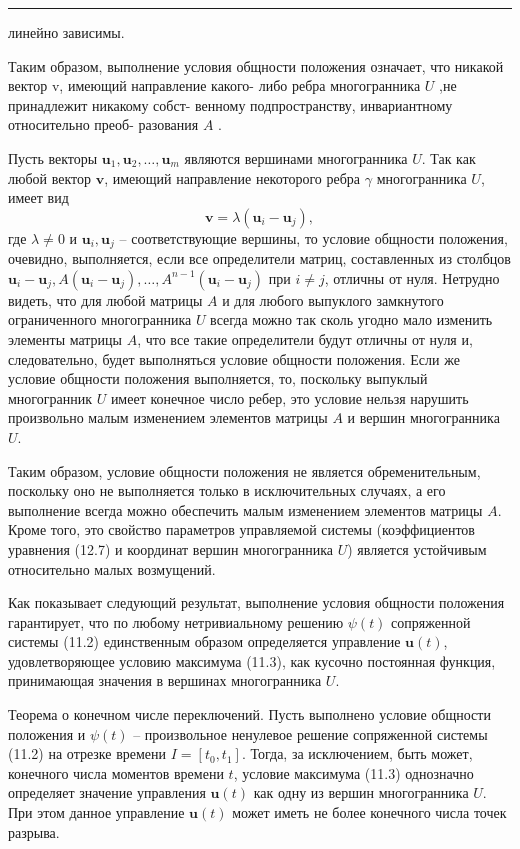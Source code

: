 \documentclass[8pt]{extarticle}
\newcommand{\HRule}{\begin{center}\rule{0.9\linewidth}{0.2mm}\end{center}}
\begin{document}
\HRule

линейно зависимы.

Таким образом, выполнение условия общности положения означает, что никакой вектор v, имеющий направление какого- либо ребра многогранника \(U\) ,не принадлежит никакому собст- венному подпространству, инвариантному относительно преоб- разования \(A\) .

Пусть векторы \({\mathbf{u}}_{1},{\mathbf{u}}_{2},\ldots ,{\mathbf{u}}_{m}\) являются вершинами многогранника \(U\). Так как любой вектор \(\mathbf{v}\), имеющий направление некоторого ребра \(\gamma\) многогранника \(U\), имеет вид
\[
\mathbf{v} = \lambda \left( {\mathbf{u}}_{i} - {\mathbf{u}}_{j}\right),
\]
где \(\lambda \neq 0\) и \({\mathbf{u}}_{i},{\mathbf{u}}_{j}\) -- соответствующие вершины, то условие общности положения, очевидно, выполняется, если все определители матриц, составленных из столбцов \({\mathbf{u}}_{i} - {\mathbf{u}}_{j}, A\left( {\mathbf{u}}_{i} - {\mathbf{u}}_{j}\right), \ldots, {A}^{n-1}\left( {\mathbf{u}}_{i} - {\mathbf{u}}_{j}\right)\) при \(i \neq j\), отличны от нуля. Нетрудно видеть, что для любой матрицы \(A\) и для любого выпуклого замкнутого ограниченного многогранника \(U\) всегда можно так сколь угодно мало изменить элементы матрицы \(A\), что все такие определители будут отличны от нуля и, следовательно, будет выполняться условие общности положения. Если же условие общности положения выполняется, то, поскольку выпуклый многогранник \(U\) имеет конечное число ребер, это условие нельзя нарушить произвольно малым изменением элементов матрицы \(A\) и вершин многогранника \(U\).

Таким образом, условие общности положения не является обременительным, поскольку оно не выполняется только в исключительных случаях, а его выполнение всегда можно обеспечить малым изменением элементов матрицы \(A\). Кроме того, это свойство параметров управляемой системы (коэффициентов уравнения (12.7) и координат вершин многогранника \(U\)) является устойчивым относительно малых возмущений.

Как показывает следующий результат, выполнение условия общности положения гарантирует, что по любому нетривиальному решению \(\psi \left( t\right)\) сопряженной системы (11.2) единственным образом определяется управление \(\mathbf{u}\left( t\right)\), удовлетворяющее условию максимума (11.3), как кусочно постоянная функция, принимающая значения в вершинах многогранника \(U\).

Теорема о конечном числе переключений. Пусть выполнено условие общности положения и \(\psi(t)\) -- произвольное ненулевое решение сопряженной системы (11.2) на отрезке времени \(I = \left[ t_{0},t_{1}\right]\). Тогда, за исключением, быть может, конечного числа моментов времени \(t\), условие максимума (11.3) однозначно определяет значение управления \(\mathbf{u}(t)\) как одну из вершин многогранника \(U\). При этом данное управление \(\mathbf{u}(t)\) может иметь не более конечного числа точек разрыва.
\end{document}
